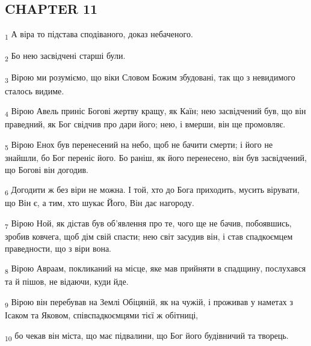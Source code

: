 \subsection{CHAPTER 11}
\begin{tcolorbox}
\textsubscript{1} А віра то підстава сподіваного, доказ небаченого.
\end{tcolorbox}
\begin{tcolorbox}
\textsubscript{2} Бо нею засвідчені старші були.
\end{tcolorbox}
\begin{tcolorbox}
\textsubscript{3} Вірою ми розуміємо, що віки Словом Божим збудовані, так що з невидимого сталось видиме.
\end{tcolorbox}
\begin{tcolorbox}
\textsubscript{4} Вірою Авель приніс Богові жертву кращу, як Каїн; нею засвідчений був, що він праведний, як Бог свідчив про дари його; нею, і вмерши, він ще промовляє.
\end{tcolorbox}
\begin{tcolorbox}
\textsubscript{5} Вірою Енох був перенесений на небо, щоб не бачити смерти; і його не знайшли, бо Бог переніс його. Бо раніш, як його перенесено, він був засвідчений, що Богові він догодив.
\end{tcolorbox}
\begin{tcolorbox}
\textsubscript{6} Догодити ж без віри не можна. І той, хто до Бога приходить, мусить вірувати, що Він є, а тим, хто шукає Його, Він дає нагороду.
\end{tcolorbox}
\begin{tcolorbox}
\textsubscript{7} Вірою Ной, як дістав був об'явлення про те, чого ще не бачив, побоявшись, зробив ковчега, щоб дім свій спасти; нею світ засудив він, і став спадкоємцем праведности, що з віри вона.
\end{tcolorbox}
\begin{tcolorbox}
\textsubscript{8} Вірою Авраам, покликаний на місце, яке мав прийняти в спадщину, послухався та й пішов, не відаючи, куди йде.
\end{tcolorbox}
\begin{tcolorbox}
\textsubscript{9} Вірою він перебував на Землі Обіцяній, як на чужій, і проживав у наметах з Ісаком та Яковом, співспадкоємцями тієї ж обітниці,
\end{tcolorbox}
\begin{tcolorbox}
\textsubscript{10} бо чекав він міста, що має підвалини, що Бог його будівничий та творець.
\end{tcolorbox}
